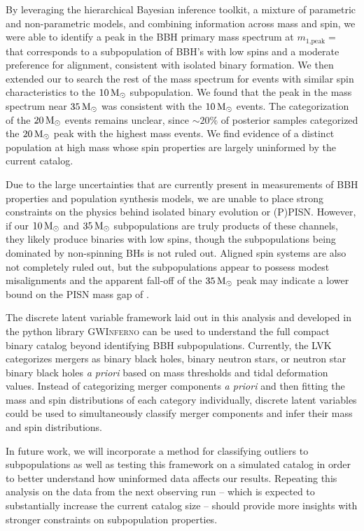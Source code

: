 By leveraging the hierarchical Bayesian inference toolkit, a mixture of parametric and non-parametric models, and combining information across mass and spin, we were able to identify a peak in the BBH primary mass spectrum at $m_\text{1,peak} = $ \result{$\CIPlusMinus{\macros[Mass][Base][PeakA][max]}$ \msun} that corresponds to a subpopulation of BBH's with low spins and a moderate preference for alignment, consistent with isolated binary formation. We then extended our \base{} to search the rest of the mass spectrum for events with similar spin characteristics to the $10{\,\rm M}_\odot$ subpopulation. We found that the peak in the mass spectrum near $35{\,\rm M}_\odot$ was consistent with the $10{\,\rm M}_\odot$ events. The categorization of the $20{\,\rm M}_\odot$ events remains unclear, since $\sim20\%$ of posterior samples categorized the $20{\,\rm M}_\odot$ peak with the highest mass events. We find evidence of a distinct population at high mass whose spin properties are largely uninformed by the current catalog.

Due to the large uncertainties that are currently present in measurements of BBH properties and population synthesis models, we are unable to place strong constraints on the physics behind isolated binary evolution or (P)PISN. However, if our $10{\,\rm M}_\odot$ and $35{\,\rm M}_\odot$ subpopulations are truly products of these channels, they likely produce binaries with low spins, though the subpopulations being dominated by non-spinning BHs is not ruled out. Aligned spin systems are also not completely ruled out, but the subpopulations appear to possess modest misalignments and the apparent fall-off of the $35{\,\rm M}_\odot$ peak may indicate a lower bound on the PISN mass gap of \result{$\CIPlusMinus{\macros[Mass][Composite][ContinuumA][99percentile]}$ \msun}.

The discrete latent variable framework laid out in this analysis and developed in the python library \textsc{GWInferno} can be used to understand the full compact binary catalog beyond identifying BBH subpopulations. Currently, the LVK categorizes mergers as binary black holes, binary neutron stars, or neutron star binary black holes \emph{a priori} based on mass thresholds and tidal deformation values. Instead of categorizing merger components \emph{a priori} and then fitting the mass and spin distributions of each category individually, discrete latent variables could be used to simultaneously classify merger components and infer their mass and spin distributions.

In future work, we will incorporate a method for classifying outliers to subpopulations as well as testing this framework on a simulated catalog in order to better understand how uninformed data affects our results. Repeating this analysis on the data from the next observing run -- which is expected to substantially increase the current catalog size -- should provide more insights with stronger constraints on subpopulation properties.